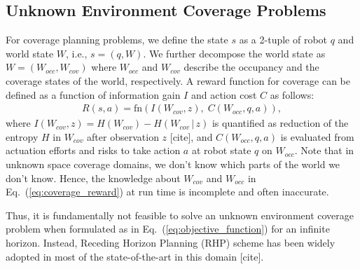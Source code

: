 \documentclass[letterpaper]{article} %
\newcommand{\phdone}[1]{} %
\begin{document}
\subsection{Unknown Environment Coverage Problems}

\phdone{Coverage Problem}
For coverage planning problems, we define the state $s$ as a 2-tuple of robot $q$ and world state $W$, i.e., $s = (q, W)$.
We further decompose the world state as $W = (W_{occ}, W_{cov})$ where $W_{occ}$ and $W_{cov}$ describe the occupancy and the coverage states of the world, respectively.
%
A reward function for coverage can be defined as a function of information gain $I$ and action cost $C$ as follows:
\begin{align}
  R(s, a) = \mathrm{fn}(I(W_{cov}, z),\; C(W_{occ}, q, a)),
  \label{eq:coverage_reward}
\end{align}
where $I(W_{cov}, z) = H(W_{cov}) - H(W_{cov} \,|\, z)$ is quantified as reduction of the entropy $H$ in $W_{cov}$ after observation $z$ [cite],  %
and $C(W_{occ}, q, a)$ is evaluated from actuation efforts and risks to take action $a$ at robot state $q$ on $W_{occ}$.
Note that in unknown space coverage domains, we don't know which parts of the world we don't know. Hence, the knowledge about $W_{cov}$ and $W_{occ}$ in Eq.~(\ref{eq:coverage_reward}) at run time is incomplete and often inaccurate.

\phdone{Receding Horizon Planning}
%
Thus, it is fundamentally not feasible to solve an unknown environment coverage problem when formulated as in Eq.~(\ref{eq:objective_function}) for an infinite horizon.
Instead, Receding Horizon Planning (RHP) scheme has been widely adopted in most of the state-of-the-art in this domain \cite{bircher2016receding}[cite].
\end{document}
